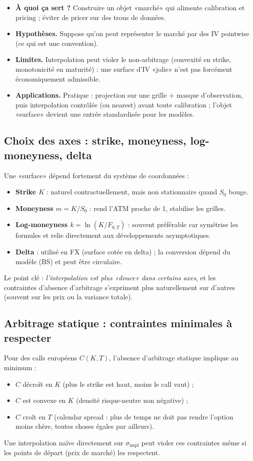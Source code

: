 \documentclass[11pt,a4paper]{report}
\theoremstyle{definition}
\theoremstyle{plain}
\theoremstyle{remark}
\newcommand{\1}{\mathbf{1}}
\newcommand{\qa}[4]{
\begin{itemize}[leftmargin=*]
\item \textbf{À quoi ça sert ?} #1
\item \textbf{Hypothèses.} #2
\item \textbf{Limites.} #3
\item \textbf{Applications.} #4
\end{itemize}
}
\begin{document}
\qa
{Construire un objet «marché» qui alimente calibration et pricing ; éviter de pricer sur des trous de données.}
{Suppose qu'on peut représenter le marché par des IV pointwise (ce qui est une convention).}
{Interpolation peut violer le non-arbitrage (convexité en strike, monotonicité en maturité) : une surface d'IV «jolie» n'est pas forcément économiquement admissible.}
{Pratique : projection sur une grille + masque d'observation, puis interpolation contrôlée (ou nearest) avant toute calibration ; l'objet «surface» devient une entrée standardisée pour les modèles.}

\subsection*{Choix des axes : strike, moneyness, log-moneyness, delta}
Une «surface» dépend fortement du système de coordonnées :
\begin{itemize}[leftmargin=*]
\item \textbf{Strike $K$} : naturel contractuellement, mais non stationnaire quand $S_0$ bouge.
\item \textbf{Moneyness $m=K/S_0$} : rend l'ATM proche de 1, stabilise les grilles.
\item \textbf{Log-moneyness $k=\ln(K/F_{0,T})$} : souvent préférable car symétrise les formules et relie directement aux développements asymptotiques.
\item \textbf{Delta} : utilisé en FX (surface cotée en delta) ; la conversion dépend du modèle (BS) et peut être circulaire.
\end{itemize}
Le point clé : \emph{l'interpolation est plus «douce» dans certains axes}, et les contraintes d'absence d'arbitrage s'expriment plus naturellement sur d'autres (souvent sur les prix ou la variance totale).

\subsection*{Arbitrage statique : contraintes minimales à respecter}
Pour des calls européens $C(K,T)$, l'absence d'arbitrage statique implique au minimum :
\begin{itemize}[leftmargin=*]
\item $C$ décroît en $K$ (plus le strike est haut, moins le call vaut) ;
\item $C$ est convexe en $K$ (densité risque-neutre non négative) ;
\item $C$ croît en $T$ (calendar spread : plus de temps ne doit pas rendre l'option moins chère, toutes choses égales par ailleurs).
\end{itemize}
Une interpolation naïve directement sur $\sigma_{\text{impl}}$ peut violer ces contraintes même si les points de départ (prix de marché) les respectent.
\end{document}
